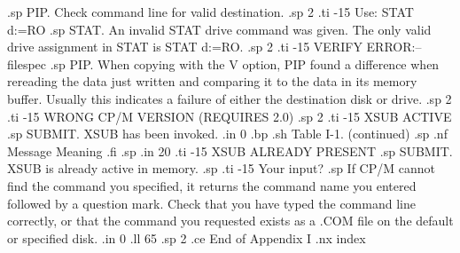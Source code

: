 .sp
PIP.  Check command line for valid destination.
.sp 2
.ti -15
Use: STAT d:=RO
.sp
STAT.  An invalid STAT drive command was given.  The only valid 
drive assignment in STAT is STAT d:=RO.
.sp 2
.ti -15
VERIFY ERROR:--{filespec}
.sp
PIP.  When copying with the V option, PIP found a difference when 
rereading the data just written and comparing it to the data in 
its memory buffer.  Usually this indicates a failure of either 
the destination disk or drive.
.sp 2
.ti -15
WRONG CP/M VERSION (REQUIRES 2.0)
.sp 2
.ti -15
XSUB ACTIVE
.sp
SUBMIT.  XSUB has been invoked.
.in 0
.bp
.sh
                     Table I-1.  (continued)
.sp
.nf
     Message        Meaning
.fi
.sp
.in 20
.ti -15
XSUB ALREADY PRESENT
.sp
SUBMIT.  XSUB is already active in memory.
.sp
.ti -15
Your input?
.sp
If CP/M cannot find the command you specified, it returns the 
command name you entered followed by a question mark.  Check that 
you have typed the command line correctly, or that the command 
you requested exists as a .COM file on the default or specified 
disk.
.in 0
.ll 65
.sp 2
.ce
End of Appendix I
.nx index
